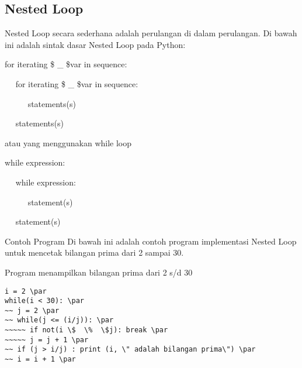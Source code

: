 \subsection{Nested Loop}
\vspace{\baselineskip}
Nested Loop secara sederhana adalah perulangan di dalam perulangan.\vspace{\baselineskip}
\vspace{\baselineskip}
Di bawah ini adalah sintak dasar Nested Loop pada Python:\vspace{\baselineskip}
\vspace{\baselineskip}
 \par
for iterating \$  \_  \$var in sequence: \par
~~ for iterating \$  \_  \$var in sequence: \par
~~~~~ statements(s) \par
~~ statements(s) \par
\vspace{\baselineskip}
atau yang menggunakan while loop\vspace{\baselineskip}
\vspace{\baselineskip}
 \par
while expression: \par
~~ while expression: \par
~~~~~ statement(s) \par
~~ statement(s) \par
\vspace{\baselineskip}
Contoh Program\vspace{\baselineskip}
\vspace{\baselineskip}
Di bawah ini adalah contoh program implementasi Nested Loop untuk mencetak bilangan prima dari 2 sampai 30.\vspace{\baselineskip}
\vspace{\baselineskip}
 \par
Program menampilkan bilangan prima dari 2 s/d 30 \par
\vspace{12pt}
\begin{verbatim}
i = 2 \par
while(i < 30): \par
~~ j = 2 \par
~~ while(j <= (i/j)): \par
~~~~~ if not(i \$  \%  \$j): break \par
~~~~~ j = j + 1 \par
~~ if (j > i/j) : print (i, \" adalah bilangan prima\") \par
~~ i = i + 1 \par
\end{verbatim}
